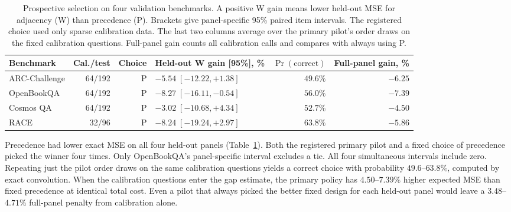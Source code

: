 \begin{table}[t]
\centering
\small
\caption{Prospective selection on four validation benchmarks. A positive W gain means lower held-out MSE
for adjacency (W) than precedence (P). Brackets give panel-specific 95\% paired item intervals.
The registered choice used only sparse calibration data. The last two columns average over the
primary pilot's order draws on the fixed calibration questions. Full-panel gain counts all
calibration calls and compares with always using P.}
\label{tab:pilot-transfer}
\begin{tabular}{@{}lrrlrr@{}}
\toprule
Benchmark & Cal./test & Choice & Held-out W gain [95\%], \% & $\Pr(\mathrm{correct})$ & Full-panel gain, \% \\
\midrule
ARC-Challenge & 64/192 & P & $-5.54\;[-12.22,+1.38]$ & $49.6\%$ & $-6.25$ \\
OpenBookQA & 64/192 & P & $-8.27\;[-16.11,-0.54]$ & $56.0\%$ & $-7.39$ \\
Cosmos QA & 64/192 & P & $-3.02\;[-10.68,+4.34]$ & $52.7\%$ & $-4.50$ \\
RACE & 32/96 & P & $-8.24\;[-19.24,+2.97]$ & $63.8\%$ & $-5.86$ \\
\bottomrule
\end{tabular}
\end{table}

Precedence had lower exact MSE on all four held-out panels
(Table~\ref{tab:pilot-transfer}). Both the registered
primary pilot and a fixed choice of precedence picked the winner four
times. Only OpenBookQA's panel-specific interval excludes a tie.
All four simultaneous intervals include zero. Repeating just the pilot
order draws on the same calibration questions yields a correct choice
with probability $49.6$--$63.8\%$, computed by exact convolution.
When the calibration questions enter the gap estimate, the primary
policy has $4.50$--$7.39\%$ higher expected MSE than fixed precedence
at identical total cost. Even a pilot that always picked the better fixed design for each
held-out panel would leave a $3.48$--$4.71\%$ full-panel penalty from calibration alone.
